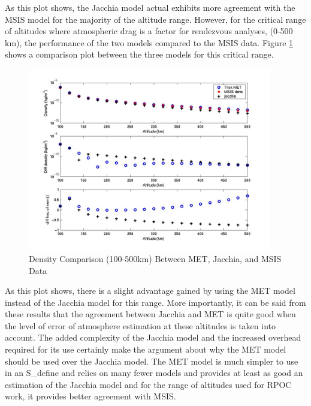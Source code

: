 \begin{description}
As this plot shows, the Jacchia model actual exhibits more agreement with the
MSIS model for the majority of the altitude range.  However, for the critical
range of altitudes where atmospheric drag is a factor for rendezvous analyses,
(0-500 km), the performance of the two models compared to the MSIS data.
Figure \ref{met_jac_critical} shows a comparison plot between the three models
for this critical range.

\begin{figure}[H]
\begin{center}
\includegraphics[height=80mm]{pics/MET_JAC_T02_temperature.jpg}
\caption{Density Comparison (100-500km) Between MET, Jacchia, and MSIS Data}
\label{met_jac_critical}
\end{center}
\end{figure}

As this plot shows, there is a slight advantage gained by using the MET model
instead of the Jacchia model for this range.  More importantly, it can be said
from these results that the agreement between Jacchia and MET is quite good when
the level of error of atmosphere estimation at these altitudes is taken into
account.  The added complexity of the Jacchia model and the increased overhead
required for its use certainly make the argument about why the MET model should
be used over the Jacchia model.  The MET model is much simpler to use in an
S\_define and relies on many fewer models and provides at least as good an
estimation of the Jacchia model and for the range of altitudes used for RPOC
work, it provides better agreement with MSIS.
\end{description}

